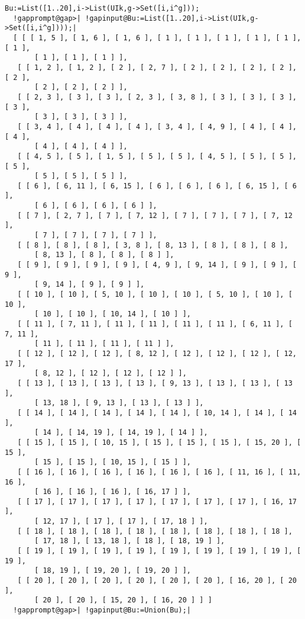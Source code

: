 \documentclass[a4paper,11pt]{report}
\begin{document}
{{ 
\begin{Verbatim}[commandchars=!@|,fontsize=\small,frame=single,label=Example]
  Bu:=List([1..20],i->List(UIk,g->Set([i,i^g])); 
  !gapprompt@gap>| !gapinput@Bu:=List([1..20],i->List(UIk,g->Set([i,i^g])));|
  [ [ [ 1, 5 ], [ 1, 6 ], [ 1, 6 ], [ 1 ], [ 1 ], [ 1 ], [ 1 ], [ 1 ], [ 1 ], 
       [ 1 ], [ 1 ], [ 1 ] ], 
   [ [ 1, 2 ], [ 1, 2 ], [ 2 ], [ 2, 7 ], [ 2 ], [ 2 ], [ 2 ], [ 2 ], [ 2 ], 
       [ 2 ], [ 2 ], [ 2 ] ], 
   [ [ 2, 3 ], [ 3 ], [ 3 ], [ 2, 3 ], [ 3, 8 ], [ 3 ], [ 3 ], [ 3 ], [ 3 ], 
       [ 3 ], [ 3 ], [ 3 ] ], 
   [ [ 3, 4 ], [ 4 ], [ 4 ], [ 4 ], [ 3, 4 ], [ 4, 9 ], [ 4 ], [ 4 ], [ 4 ], 
       [ 4 ], [ 4 ], [ 4 ] ], 
   [ [ 4, 5 ], [ 5 ], [ 1, 5 ], [ 5 ], [ 5 ], [ 4, 5 ], [ 5 ], [ 5 ], [ 5 ], 
       [ 5 ], [ 5 ], [ 5 ] ], 
   [ [ 6 ], [ 6, 11 ], [ 6, 15 ], [ 6 ], [ 6 ], [ 6 ], [ 6, 15 ], [ 6 ], 
       [ 6 ], [ 6 ], [ 6 ], [ 6 ] ], 
   [ [ 7 ], [ 2, 7 ], [ 7 ], [ 7, 12 ], [ 7 ], [ 7 ], [ 7 ], [ 7, 12 ], 
       [ 7 ], [ 7 ], [ 7 ], [ 7 ] ], 
   [ [ 8 ], [ 8 ], [ 8 ], [ 3, 8 ], [ 8, 13 ], [ 8 ], [ 8 ], [ 8 ], 
       [ 8, 13 ], [ 8 ], [ 8 ], [ 8 ] ], 
   [ [ 9 ], [ 9 ], [ 9 ], [ 9 ], [ 4, 9 ], [ 9, 14 ], [ 9 ], [ 9 ], [ 9 ], 
       [ 9, 14 ], [ 9 ], [ 9 ] ], 
   [ [ 10 ], [ 10 ], [ 5, 10 ], [ 10 ], [ 10 ], [ 5, 10 ], [ 10 ], [ 10 ], 
       [ 10 ], [ 10 ], [ 10, 14 ], [ 10 ] ], 
   [ [ 11 ], [ 7, 11 ], [ 11 ], [ 11 ], [ 11 ], [ 11 ], [ 6, 11 ], [ 7, 11 ], 
       [ 11 ], [ 11 ], [ 11 ], [ 11 ] ], 
   [ [ 12 ], [ 12 ], [ 12 ], [ 8, 12 ], [ 12 ], [ 12 ], [ 12 ], [ 12, 17 ], 
       [ 8, 12 ], [ 12 ], [ 12 ], [ 12 ] ], 
   [ [ 13 ], [ 13 ], [ 13 ], [ 13 ], [ 9, 13 ], [ 13 ], [ 13 ], [ 13 ], 
       [ 13, 18 ], [ 9, 13 ], [ 13 ], [ 13 ] ], 
   [ [ 14 ], [ 14 ], [ 14 ], [ 14 ], [ 14 ], [ 10, 14 ], [ 14 ], [ 14 ], 
       [ 14 ], [ 14, 19 ], [ 14, 19 ], [ 14 ] ], 
   [ [ 15 ], [ 15 ], [ 10, 15 ], [ 15 ], [ 15 ], [ 15 ], [ 15, 20 ], [ 15 ], 
       [ 15 ], [ 15 ], [ 10, 15 ], [ 15 ] ], 
   [ [ 16 ], [ 16 ], [ 16 ], [ 16 ], [ 16 ], [ 16 ], [ 11, 16 ], [ 11, 16 ], 
       [ 16 ], [ 16 ], [ 16 ], [ 16, 17 ] ], 
   [ [ 17 ], [ 17 ], [ 17 ], [ 17 ], [ 17 ], [ 17 ], [ 17 ], [ 16, 17 ], 
       [ 12, 17 ], [ 17 ], [ 17 ], [ 17, 18 ] ], 
   [ [ 18 ], [ 18 ], [ 18 ], [ 18 ], [ 18 ], [ 18 ], [ 18 ], [ 18 ], 
       [ 17, 18 ], [ 13, 18 ], [ 18 ], [ 18, 19 ] ], 
   [ [ 19 ], [ 19 ], [ 19 ], [ 19 ], [ 19 ], [ 19 ], [ 19 ], [ 19 ], [ 19 ], 
       [ 18, 19 ], [ 19, 20 ], [ 19, 20 ] ], 
   [ [ 20 ], [ 20 ], [ 20 ], [ 20 ], [ 20 ], [ 20 ], [ 16, 20 ], [ 20 ], 
       [ 20 ], [ 20 ], [ 15, 20 ], [ 16, 20 ] ] ]
  !gapprompt@gap>| !gapinput@Bu:=Union(Bu);|

\end{Verbatim}}}
\end{document}
